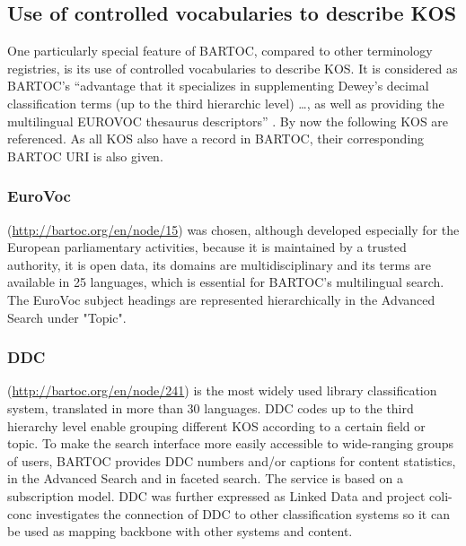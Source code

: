 \documentclass[12pt,a4paper]{llncs}
\begin{document}
\begin{table}

\end{table}

\subsection{Use of controlled vocabularies to describe KOS}
One particularly special feature of BARTOC, compared to other terminology registries, is its use of controlled vocabularies to describe KOS. It is considered as BARTOC's ``advantage that it specializes in supplementing Dewey’s decimal classification terms (up to the third hierarchic level) \ldots, as well as providing the multilingual EUROVOC thesaurus descriptors'' \cite{bratkova2014revue}. By now the following KOS are referenced. As all KOS also have a record in BARTOC, their corresponding BARTOC URI is also given.

\subsubsection{EuroVoc}
(\href{http://bartoc.org/en/node/15}{http://bartoc.org/en/node/15}) was chosen, although developed especially for the European parliamentary activities, because it is maintained by a trusted authority, it is open data, its domains are multidisciplinary and its terms are available in 25 languages, which is essential for BARTOC's multilingual search. The EuroVoc subject headings are represented hierarchically in the Advanced Search under "Topic". 

\subsubsection{DDC}
(\href{http://bartoc.org/en/node/241}{http://bartoc.org/en/node/241})
is the most widely used library classification system, translated in more than 30 languages. DDC codes up to the third hierarchy level enable grouping different KOS according to a certain field or topic. To make the search interface more easily accessible to wide-ranging groups of users, BARTOC provides DDC numbers and/or captions for content statistics, in the Advanced Search and in faceted search. The service is based on a subscription model. DDC was further expressed as Linked Data \cite{panzer2013dewey} and project coli-conc investigates the connection of DDC to other classification systems so it can be used as mapping backbone with other systems and content.
\end{document}
